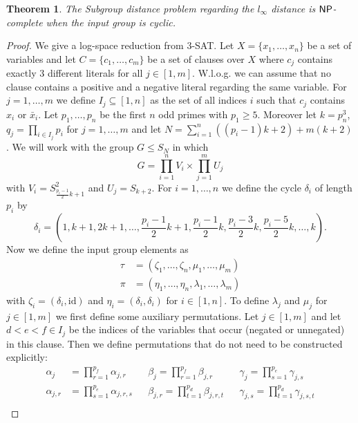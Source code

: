 \documentclass{article}
\newtheorem{theorem}{Theorem}
\begin{document}
\begin{theorem}
The {\sc Subgroup distance problem} regarding the $l_\infty$ distance is ${\sf NP}$-complete when the input group is cyclic.
\end{theorem}
\begin{proof}
We give a log-space reduction from \textsc{3-SAT}. Let $X = \{x_1,\dots,x_n\}$ be a set of variables and let $C = \{c_1,\dots,c_m\}$ be a set of clauses over $X$ where $c_j$ contains exactly $3$ different literals for all $j \in [1,m]$. W.l.o.g. we can assume that no clause contains a positive and a negative literal regarding the same variable. For $j=1,\dots,m$ we define $I_j \subseteq [1,n]$ as the set of all indices $i$ such that $c_j$ contains $x_i$ or $\bar{x}_i$. Let $p_1,\dots,p_n$ be the first $n$ odd primes with $p_1 \geq 5$. Moreover let $k = p_n^3$, $q_j = \prod_{i \in I_j} p_i$ for $j=1,\dots,m$ and let $N = \sum_{i=1}^n ((p_i-1)k+2) + m(k+2)$. We will work with the group $G \leq S_N$ in which
\begin{displaymath}
G = \prod_{i=1}^n V_i \times \prod_{j=1}^m U_j
\end{displaymath}
with $V_i = S_{\frac{p_i-1}{2}k+1}^2$ and $U_j = S_{k+2}$. For $i=1,\dots,n$ we define the cycle $\delta_i$ of length $p_i$ by
\begin{displaymath}
\delta_i = (1, k+1, 2k+1, \dots, \frac{p_i-1}{2}k+1, \frac{p_i-1}{2}k, \frac{p_i-3}{2}k, \frac{p_i-5}{2}k, \dots, k).
\end{displaymath}
Now we define the input group elements as
\begin{align*}
\tau&= (\zeta_1,\dots,\zeta_n,\mu_1,\dots,\mu_m)\\
\pi&= (\eta_1,\dots,\eta_n,\lambda_1,\dots,\lambda_m)
\end{align*}
with $\zeta_i = (\delta_i, \mathrm{id})$ and $\eta_i = (\delta_i, \delta_i)$ for $i \in [1,n]$. To define $\lambda_j$ and $\mu_j$ for $j \in [1,m]$ we first define some auxiliary permutations. Let $j \in [1,m]$ and let $d < e < f \in I_j$ be the indices of the variables that occur (negated or unnegated) in this clause. Then we define permutations that do not need to be constructed explicitly:
\begin{align*}
\alpha_j&= \prod_{r=1}^{p_f} \alpha_{j,r} && \beta_j = \prod_{r=1}^{p_f} \beta_{j,r} && \gamma_j = \prod_{s=1}^{p_e} \gamma_{j,s}\\
\alpha_{j,r}&= \prod_{s=1}^{p_e} \alpha_{j,r,s} && \beta_{j,r} = \prod_{t=1}^{p_d} \beta_{j,r,t} && \gamma_{j,s} = \prod_{t=1}^{p_d} \gamma_{j,s,t}\\

\end{align*}
\end{proof}
\end{document}
